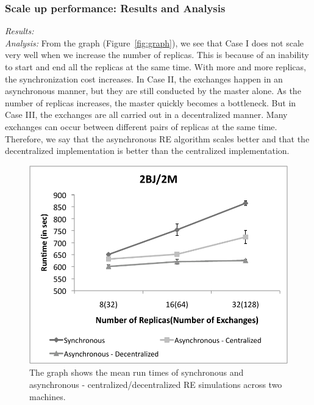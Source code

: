 \documentclass[a4paper,10pt]{article}
\begin{document}
\subsubsection{Scale up performance: Results and Analysis}

{\it Results:}\\

{\it Analysis: } From the graph (Figure~\ref{fig:graph}), we see that
Case I does not scale very well when we increase the number of
replicas. This is because of an inability to start and end all the
replicas at the same time. With more and more replicas, the
synchronization cost increases.  In Case II, the exchanges happen in
an asynchronous manner, but they are still conducted by the master
alone. As the number of replicas increases, the master quickly becomes
a bottleneck. But in Case III, the exchanges are all carried out in a
decentralized manner. Many exchanges can occur between different pairs
of replicas at the same time. Therefore, we say that the asynchronous
RE algorithm scales better and that the decentralized implementation
is better than the centralized implementation.

%
\begin{figure}
\centering
\includegraphics[scale=0.80]{data/2Machines.pdf}
\caption{\small The graph shows the mean run times of synchronous and asynchronous - centralized/decentralized RE simulations across two machines.}
\label{fig:2machines}
\vspace{-1em}
\end{figure}
\end{document}
